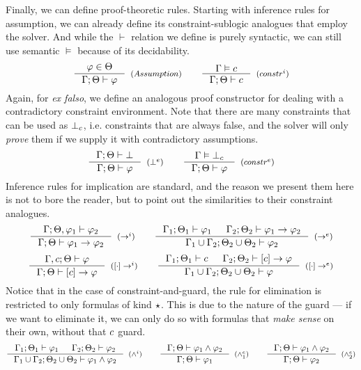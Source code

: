\documentclass[english, mgr]{iithesis}
\renewcommand{\it}[1]{\textit{#1}}
\begin{document}
Finally, we can define proof-theoretic rules.
Starting with inference rules for assumption,
we can already define its constraint-sublogic analogues that employ the solver.
And while the $\vdash$ relation we define is purely syntactic,
we can still use semantic $\vDash$ because of its decidability.
$$
  \inference{
    \formphi \in \Theta
  }{
    \jgmnt[\cEnv;\Theta]{\formphi}
  }[(\ensuremath{Assumption})]
  \qquad
  \inference{
    \cjgmnt[\cEnv]{\constr}
  }{
    \jgmnt[\cEnv;\Theta]{\constr}
  }[(\ensuremath{constr^i})]
$$
Again, for \it{ex falso}, we define an analogous proof constructor for dealing with a contradictory
constraint environment.
Note that there are many constraints that can be used as $\bot_c$, i.e.
constraints that are always false, and the solver will only \it{prove} them
if we supply it with contradictory assumptions.
$$
  \inference{
    \jgmnt[\cEnv;\Theta]{\bot}
  }{
    \jgmnt[\cEnv;\Theta]{\formphi}
  }[(\ensuremath{\bot^e})]
  \qquad
  \inference{
    \cjgmnt[\cEnv]{\bot_\constr}
    }{
    \jgmnt[\cEnv;\Theta]{\formphi}
  }[(\ensuremath{constr^e})]
$$
Inference rules for implication are standard, and the reason we present them here
is not to bore the reader, but to point out the similarities to their constraint analogues.
$$
  \inference{
    \jgmnt[\cEnv;\Theta,\formphi_1]{\formphi_2}
  }{
    \jgmnt[\cEnv;\Theta]{\formphi_1 \fImp \formphi_2}
  }[(\ensuremath{\fImp^i})]
  \qquad
  \inference{
    \jgmnt[\cEnv_1;\Theta_1]{\formphi_1} &
    \jgmnt[\cEnv_2;\Theta_2]{\formphi_1 \fImp \formphi_2}
    }{
    \jgmnt[\cEnv_1 \cup \cEnv_2;\Theta_2 \cup \Theta_2]{\formphi_2}
  }[(\ensuremath{\fImp^e})]
$$
$$
  \inference{
    \jgmnt[\cEnv, \constr;\Theta]{\formphi}
  }{
    \jgmnt[\cEnv;\Theta]{\fCImp{\constr}\formphi}
  }[(\ensuremath{\fCImp{\cdot}^i})]
  \qquad
  \inference{
    \jgmnt[\cEnv_1;\Theta_1]{\constr} &
    \jgmnt[\cEnv_2;\Theta_2]{\fCImp{\constr}\formphi}
    }{
    \jgmnt[\cEnv_1 \cup \cEnv_2;\Theta_2 \cup \Theta_2]{\formphi}
  }[(\ensuremath{\fCImp{\cdot}^e})]
$$
Notice that in the case of constraint-and-guard, the rule for elimination is restricted
to only formulas of kind $\star$.
This is due to the nature of the guard --- if we want to eliminate it,
we can only do so with formulas that \it{make sense} on their own,
without that $c$ guard.
$$
  \inference{
    \jgmnt[\cEnv_1;\Theta_1]{\formphi_1} &
    \jgmnt[\cEnv_2;\Theta_2]{\formphi_2}
  }{
    \jgmnt[\cEnv_1 \cup \cEnv_2;\Theta_2 \cup \Theta_2]{\formphi_1 \wedge \formphi_2}
  }[(\ensuremath{\wedge^i})]
  \qquad
  \inference{
    \jgmnt[\cEnv;\Theta]{\formphi_1 \wedge \formphi_2}
    }{
    \jgmnt[\cEnv;\Theta]{\formphi_1}
  }[(\ensuremath{\wedge^e_1})]\qquad
  \inference{
    \jgmnt[\cEnv;\Theta]{\formphi_1 \wedge \formphi_2}
    }{
    \jgmnt[\cEnv;\Theta]{\formphi_2}
  }[(\ensuremath{\wedge^e_2})]
$$
\end{document}

